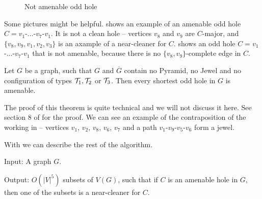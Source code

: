 \begin{figure}
  \begin{minipage}{.5\textwidth}
      
			\label{fig:amenableOddHole}
  \end{minipage}%
  \begin{minipage}{.5\textwidth}
      
			\caption{Not amenable odd hole}
			\label{fig:notAmenableHole}
  \end{minipage}
  \end{figure}

Some pictures might be helpful.  shows an example of an amenable odd hole $C = v_1$-$\ldots$-$v_7$-$v_1$. It is not a clean hole -- vertices $v_8$ and $v_9$ are $C$-major, and $\{v_8, v_9, v_1, v_2, v_3\}$ is an axample of a near-cleaner for $C$.
 shows an odd hole $C = v_1$-$\ldots$-$v_7$-$v_1$ that is not amenable, because there is no $\{v_8, v_9\}$-complete edge in $C$.

\begin{theorem}
	\label{thm:amenableHoles}
	Let $G$ be a graph, such that $G$ and $\overline{G}$ contain no Pyramid, no Jewel and no configuration of types $\mathcal{T}_1, \mathcal{T}_2$ or $\mathcal{T}_3$. Then every shortest odd hole in $G$ is amenable.
\end{theorem}

The proof of this theorem is quite technical and we will not discuss it here. See section 8 of \cite{MC05} for the proof. We can see an example of the contraposition of the  working in  -- vertices $v_1$, $v_2$, $v_8$, $v_6$, $v_7$ and a path $v_1$-$v_9$-$v_5$-$v_6$ form a jewel.

With  we can describe the rest of the algorithm.

\begin{alg}
	\label{alg:listNearCleaners}
	Input: A graph $G$.

	\noindent Output: $O(|V|^5)$ subsets of $V(G)$, such that if $C$ is an amenable hole in $G$, then one of the subsets is a near-cleaner for $C$.
\end{alg}

